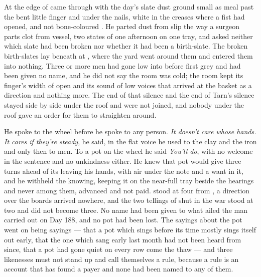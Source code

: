 \scenebreak

At the edge of   came through with the day's slate dust ground small as meal past the bent little finger and under the nails, white in the creases where a fist had opened, and not bone-coloured . He parted dust from slip the way a surgeon parts clot from vessel, two states of one afternoon on one tray, and asked neither which slate had been broken nor whether it had been a birth-slate. The broken birth-slates lay beneath  at , where the yard went around them and entered them into nothing. Three or more men had gone low into  before first grey and had been given no name, and he did not say the room was cold; the room kept its finger's width of open and its sound of low voices that arrived at the basket as a direction and nothing more. The end of that silence and the end of Tarn's silence stayed side by side under the roof and were not joined, and nobody under the roof gave an order for them to straighten around.

He spoke to the wheel before he spoke to any person. \emph{It doesn't care whose hands. It cares if they're steady}, he said, in the flat voice he used to the clay and the iron and only then to men. To a pot on the wheel he said \emph{You'll do}, with no welcome in the sentence and no unkindness either. He knew  that pot would give three turns ahead of its leaving his hands, with air under the note and a want in it, and he withheld the knowing, keeping it on the near-full tray beside the hearings and never among them, advanced and not paid.  stood at four from , a direction over the boards arrived nowhere, and the two tellings of  shut in the war stood at two and did not become three. No name had been given to what ailed the man carried out on Day 188, and no pot had been lost. The sayings about the pot went on being sayings --- that a pot which sings before its time mostly sings itself out early, that the one which sang early last month had not been heard from since, that a pot had gone quiet on every row come the thaw --- and three likenesses must not stand up and call themselves a rule, because a rule is an account that has found a payer and none had been named to any of them.

